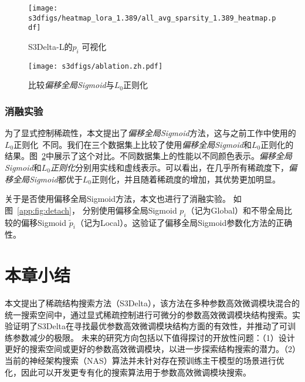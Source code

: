 \begin{figure}[!htbp]
    \centering
    \texttt{[image: s3dfigs/heatmap\_lora\_1.389/all\_avg\_sparsity\_1.389\_heatmap.pdf]} 
    \caption{S3Delta-L的$p_{i}$ 可视化}
    \label{fig:vis-delta2}
\end{figure}


\begin{figure}
       \centering
       \texttt{[image: s3dfigs/ablation.zh.pdf]}
       \caption{比较\emph{偏移全局Sigmoid}与$L_0$正则化}
       \label{fig:ablation}
\end{figure}

\subsubsection{消融实验}

为了显式控制稀疏性，本文提出了\emph{偏移全局Sigmoid}方法，这与之前工作中使用的$L_0$正则化~\cite{louizos2017learning}不同。我们在三个数据集上比较了使用\emph{偏移全局Sigmoid}和$L_0$正则化的结果。图~\ref{fig:ablation}中展示了这个对比。不同数据集上的性能以不同颜色表示。\emph{偏移全局Sigmoid}和\emph{$L_0$正则化}分别用实线和虚线表示。可以看出，在几乎所有稀疏度下，\emph{偏移全局Sigmoid}都优于$L_0$正则化，并且随着稀疏度的增加，其优势更加明显。


关于是否使用偏移全局Sigmoid方法，本文也进行了消融实验。 如图~\ref{app:fig:detach}， 分别使用偏移全局Sigmoid $p_i$（记为Global）和不带全局比较的偏移Sigmoid $\tilde{p}_i$（记为Local）。这验证了偏移全局Sigmoid参数化方法的正确性。


\section{本章小结}
本文提出了稀疏结构搜索方法（S3Delta），该方法在多种参数高效微调模块混合的统一搜索空间中，通过显式稀疏控制进行可微分的参数高效微调模块结构搜索。实验证明了S3Delta在寻找最优参数高效微调模块结构方面的有效性，并推动了可训练参数减少的极限。
未来的研究方向包括以下值得探讨的开放性问题：（1）设计更好的搜索空间或更好的参数高效微调模块，以进一步探索结构搜索的潜力。（2）当前的神经架构搜索（NAS）算法并未针对存在预训练主干模型的场景进行优化，因此可以开发更专有化的搜索算法用于参数高效微调模块搜索。


